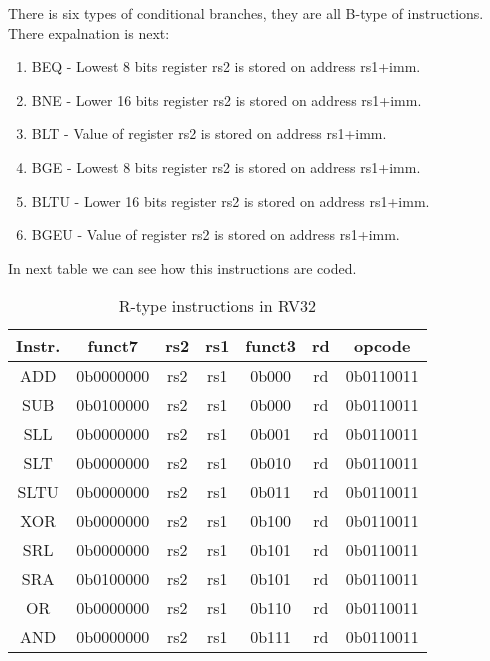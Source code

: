 \documentclass{scrreprt}
\begin{document}
    \hfill \break
    There is six types of conditional branches, they are all B-type of instructions. There expalnation is next:
    \begin{enumerate}
        \item BEQ - Lowest 8 bits register rs2 is stored on address rs1+imm. 
        \item BNE - Lower 16 bits register rs2 is stored on address rs1+imm. 
        \item BLT - Value of register rs2 is stored on address rs1+imm.
        \item BGE - Lowest 8 bits register rs2 is stored on address rs1+imm. 
        \item BLTU - Lower 16 bits register rs2 is stored on address rs1+imm. 
        \item BGEU - Value of register rs2 is stored on address rs1+imm.
    \end{enumerate}
    
    In next table we can see how this instructions are coded.       
    \begin{table}[ht]
        \centering
        \begin{tabular}{|c|c|c|c|c|c|c|} \hline 
             Instr. & funct7 & rs2 & rs1 & funct3 & rd & opcode\\ \hline 
             ADD & 0b0000000 & rs2 & rs1 & 0b000 & rd & 0b0110011\\ \hline 
             SUB & 0b0100000 & rs2 & rs1 & 0b000 & rd & 0b0110011\\ \hline 
             SLL & 0b0000000 & rs2 & rs1 & 0b001 & rd & 0b0110011\\ \hline 
             SLT & 0b0000000 & rs2 & rs1 & 0b010 & rd & 0b0110011\\ \hline 
             SLTU & 0b0000000 & rs2 & rs1 & 0b011 & rd & 0b0110011\\ \hline 
             XOR & 0b0000000 & rs2 & rs1 & 0b100 & rd & 0b0110011\\ \hline 
             SRL & 0b0000000 & rs2 & rs1 & 0b101 & rd & 0b0110011\\ \hline 
             SRA & 0b0100000 & rs2 & rs1 & 0b101 & rd & 0b0110011 \\ \hline 
             OR & 0b0000000 & rs2 & rs1 & 0b110 & rd & 0b0110011\\ \hline 
             AND & 0b0000000 & rs2 & rs1 & 0b111 & rd & 0b0110011\\ \hline
        \end{tabular}
        \caption{R-type instructions in RV32}
        \label{tab:table}
    \end{table}
    \newline
    
\end{document}
